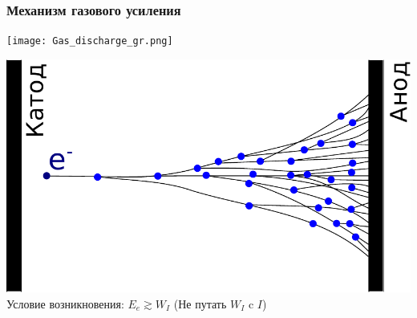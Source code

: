 \documentclass[14pt]{beamer}
\begin{document}
\begin{frame}
\frametitle{Механизм газового усиления}
\begin{minipage}[h]{0.49\linewidth}
	\texttt{[image: Gas\_discharge\_gr.png]}
\end{minipage}
\begin{minipage}[h]{0.49\linewidth}
	\includegraphics[width=1\linewidth]{Electron_avalanche.pdf}
	\newline
	\newline \footnotesize{Условие возникновения: $E_e \gtrsim W_I$}
	\newline (Не путать $W_I$ c $I$)
\end{minipage}
\end{frame}
\end{document}
